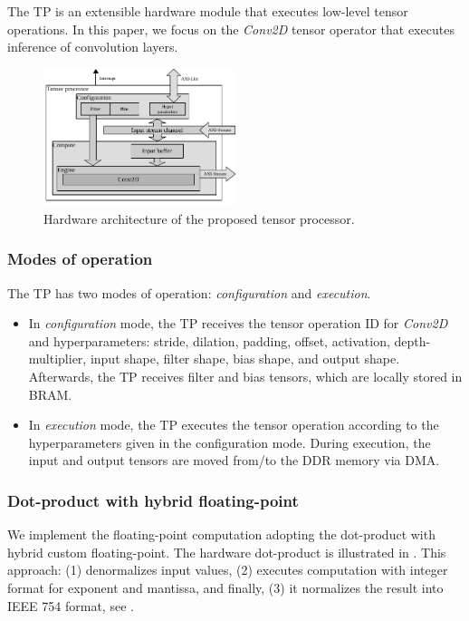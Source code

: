 The TP is an extensible hardware module that executes low-level tensor operations. In this paper, we focus on the \emph{Conv2D} tensor operator that executes inference of convolution layers.

\begin{figure}[t!]
	\centering
	\includegraphics[width=0.5\textwidth]{../figures/accelerator.pdf}
	\caption{Hardware architecture of the proposed tensor processor.}
	\label{fig:accelerator}
\end{figure}
\subsubsection{\textbf{Modes of operation}}
The TP has two modes of operation: \emph{configuration} and \emph{execution}.
\begin{itemize}
	\item In \emph{configuration} mode, the TP receives the tensor operation ID for \emph{Conv2D} and hyperparameters: stride, dilation, padding, offset, activation, depth-multiplier, input shape, filter shape, bias shape, and output shape. Afterwards, the TP receives filter and bias tensors, which are locally stored in BRAM.
	
	\item In \emph{execution} mode, the TP executes the tensor operation according to the hyperparameters given in the configuration mode. During execution, the input and output tensors are moved from/to the DDR memory via DMA.
\end{itemize}
\subsubsection{\textbf{Dot-product with hybrid floating-point}}
\label{sec:dot_product}
We implement the floating-point computation adopting the dot-product with hybrid custom floating-point\cite{nevarez2021accelerating}. The hardware dot-product is illustrated in . This approach: (1) denormalizes input values, (2) executes computation with integer format for exponent and mantissa, and finally, (3) it normalizes the result into IEEE 754 format, see . 

